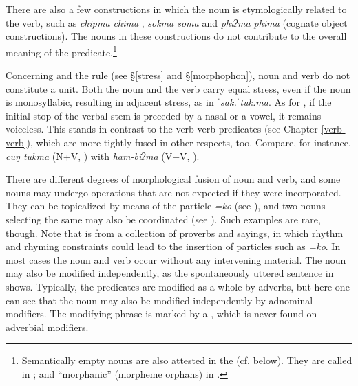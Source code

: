 There are also a few constructions in which the noun is etymologically related to the verb, such as  \emph{chipma chima} , \emph{sokma soma}  and \emph{phiʔma phima}  (cognate object constructions). The nouns in these constructions do  not contribute to the overall meaning of the predicate.\footnote{Semantically empty nouns are also attested in the  (cf. below). They are called  in \citet{Bickel1995In-the-vestibule, Bickel1997The-possessive}; and “morphanic” (morpheme orphans) in  \citet{Matisoff1986Hearts}.} 

Concerning  and the  rule (see §\ref{stress} and §\ref{morphophon}), noun and verb do not constitute a unit. Both the noun and the verb carry equal stress, even if the noun is monosyllabic, resulting in adjacent stress, as in \emph{ˈsak.ˈtuk.ma}. As for , if the initial stop of the verbal stem is preceded by a nasal or a vowel, it remains voiceless. This stands in contrast to the verb-verb predicates (see Chapter \ref{verb-verb}), which are more tightly fused in other respects, too. Compare, for instance, \emph{cuŋ tukma}  (N+V, ) with  \emph{ham-biʔma}  (V+V, ). 

There are different degrees of morphological fusion of noun and verb, and some nouns may undergo operations that are not expected if they were incorporated. They can be topicalized by means of the particle \emph{=ko} (see \Next[a]), and two nouns selecting the same  may also be coordinated (see \Next[b]). Such examples are rare, though. Note that \Next[a] is from a collection of proverbs and sayings, in which rhythm and rhyming constraints could lead to the insertion of particles such as \emph{=ko}. In most cases the noun and verb occur without any intervening material. The noun may also be modified independently, as the spontaneously uttered sentence in \Next[c] shows. Typically, the predicates are modified as a whole by adverbs, but here one can see that the noun may also be modified independently by adnominal modifiers. The modifying phrase is marked by a , which is never found on adverbial modifiers.

